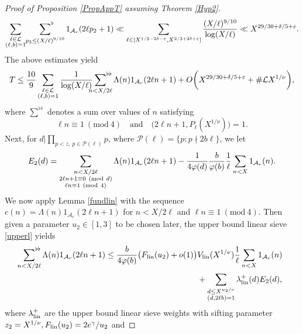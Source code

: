 \documentclass[12pt]{amsart}
\numberwithin{equation}{section}
\theoremstyle{remark}
\theoremstyle{definition}
\newcommand{\imod}[1]{\ (\mathrm{mod}\ #1)}
\begin{document}
\begin{proof}[Proof of Proposition \ref{PropAppT} assuming Theorem \ref{Hyp2}]
\begin{align}
\notag \sum_{\substack{\ell \in \mathcal{L}\\(\ell, b)=1}}\sideset{}{^\flat}\sum_{\substack{p_2\leq (X/\ell)^{9/10}}}1_{\mathcal{A}_r}(2\ell p_2 +1)\ll \sum_{\ell\in [X^{1/3-2\delta-\varepsilon}, X^{2/3+2\delta+\varepsilon}]}\dfrac{(X/\ell)^{9/10}}{\log (X/\ell)} \ll X^{29/30+\delta/5+\varepsilon}.
\end{align}
The above estimates yield
\begin{align}
\label{T0}T\leq \dfrac{10}{9}\sum_{\substack{\ell \in \mathcal{L}\\(\ell, b)=1}}\dfrac{1}{\log (X/\ell)}\sideset{}{^{\flat\flat}}\sum_{\substack{n< X/2\ell}}\Lambda(n)1_{\mathcal{A}_r}(2\ell n +1) + O\bigg(X^{29/30+\delta/5+\varepsilon} + \#\mathcal{L}X^{1/\nu}\bigg),
\end{align}
where $\sum^{\flat\flat}$ denotes a sum over values of $n$ satisfying  
\[\ell n\equiv 1\imod 4 \quad \text{and} \quad \big(2\ell n + 1, P_{\ell}(X^{1/\nu})\big)=1.\]
Next, for $d|\prod_{p<z,\: p\in \mathcal{P}(\ell)}p$, where $\mathcal{P}(\ell)=\{p:p\nmid 2b\ell\}$, we let
\begin{align}
\notag {E}_2(d)=\sum_{\substack{n< X/2\ell\\  2 \ell n+1\equiv 0\imod {d}\\ \ell n\equiv 1\imod 4}}\Lambda(n)1_{\mathcal{A}_r}(2\ell n+1)-\dfrac{1}{4\varphi(d)}\dfrac{b}{\varphi(b)}\dfrac{1}{\ell}\sum_{n<X}1_{\mathcal{A}_r}(n).
\end{align}
We now apply Lemma \ref{fundlin} with the sequence $c(n) = \Lambda(n)1_{\mathcal{A}_r}(2\ell n +1)$ for $n<X/2\ell$ and $\ell n\equiv 1\imod 4$. Then given a parameter $u_2\in[1, 3]$ to be chosen later, the upper bound linear sieve \eqref{upperl} yields
\begin{align}\label{Sl}
\begin{aligned}
 \sideset{}{^{\flat\flat}}\sum_{\substack{n< X/2\ell}}\Lambda(n)1_{\mathcal{A}_r}(2\ell n +1)\leq  \dfrac{b}{4\varphi(b)}\big(F_{\textup{lin}}(u_2)+o(1)\big) &V_{\textup{lin}}(X^{1/\nu}) \dfrac{1}{\ell}\sum_{n<X}1_{\mathcal{A}_r}(n)\\
 &+ \sum_{\substack{d\leq X^{u_2/\nu}\\(d,2\ell b)=1}}\lambda^+_{\textup{lin}}(d){E}_2(d),
\end{aligned}
\end{align}
where $\lambda^+_{\textup{lin}}$ are the upper bound linear sieve weights with sifting parameter $z_2=X^{1/\nu}, F_{\textup{lin}}(u_2)=2e^\gamma/u_2$ and 

\end{proof}
\end{document}

